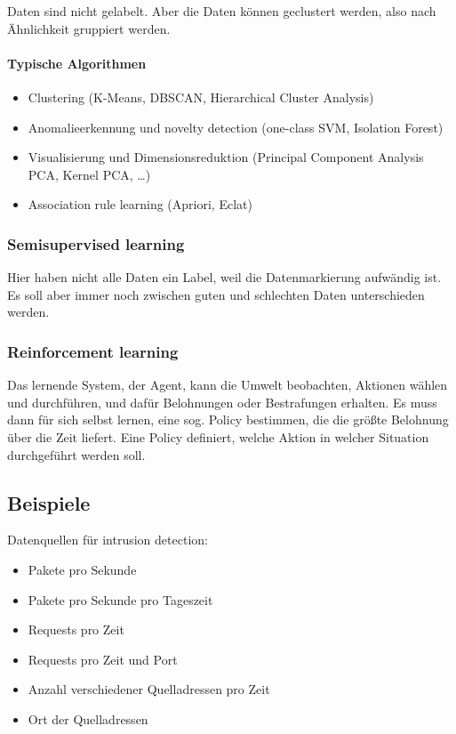 Daten sind nicht gelabelt.
Aber die Daten können geclustert werden, also nach Ähnlichkeit gruppiert werden.

\paragraph{Typische Algorithmen}%
\label{par:typische_algorithmen}

\begin{itemize}
  \item Clustering (K-Means, DBSCAN, Hierarchical Cluster Analysis)
  \item Anomalieerkennung und novelty detection (one-class SVM, Isolation Forest)
  \item Visualisierung und Dimensionsreduktion (Principal Component Analysis PCA, Kernel
    PCA, \ldots)
  \item Association rule learning (Apriori, Eclat)
\end{itemize}

\subsubsection{Semisupervised learning}%
\label{ssub:semisupervised_learning}

Hier haben nicht alle Daten ein Label, weil die Datenmarkierung aufwändig ist.
Es soll aber immer noch zwischen guten und schlechten Daten unterschieden werden.

\subsubsection{Reinforcement learning}%
\label{ssub:reinforcement_learning}

Das lernende System, der Agent, kann die Umwelt beobachten, Aktionen wählen und
durchführen, und dafür Belohnungen oder Bestrafungen erhalten.
Es muss dann für sich selbst lernen, eine sog. Policy bestimmen, die die größte Belohnung
über die Zeit liefert.
Eine Policy definiert, welche Aktion in welcher Situation durchgeführt werden soll.

\subsection{Beispiele}%
\label{sub:beispiele}

Datenquellen für intrusion detection:
\begin{itemize}
  \item Pakete pro Sekunde
  \item Pakete pro Sekunde pro Tageszeit
  \item Requests pro Zeit
  \item Requests pro Zeit und Port
  \item Anzahl verschiedener Quelladressen pro Zeit
  \item Ort der Quelladressen
\end{itemize}

